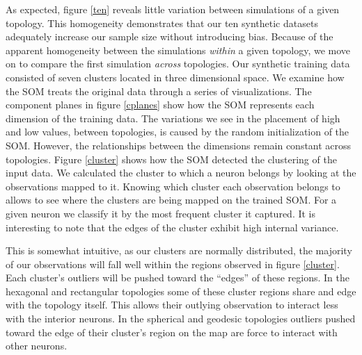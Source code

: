 As expected, figure \ref{ten} reveals little variation 
between simulations of a given topology.  This homogeneity demonstrates that
our ten synthetic datasets adequately increase our sample size without introducing bias.  
Because of the apparent homogeneity between the simulations \emph{within} a
given topology, we move on to compare the first simulation \emph{across} topologies.  
Our synthetic training data consisted of seven clusters located in three
dimensional space. We examine how the SOM treats the original data through a
series of visualizations.  The component planes in figure \ref{cplanes} show
how the SOM represents each dimension of the training data.  The variations we
see in the placement of high and low values, between topologies, is caused by
the random initialization of the SOM.  However, the relationships between the
dimensions remain constant across topologies.  Figure \ref{cluster} shows how
the SOM detected the clustering of the input data.  We calculated the cluster
to which a neuron belongs by looking at the observations mapped to it.
Knowing which cluster each observation belongs to allows to see where the
clusters are being mapped on the trained SOM. For a given neuron we classify
it by the most frequent cluster it captured.  It is interesting to note that
the edges of the cluster exhibit high internal variance.

This is somewhat intuitive, as our clusters are normally distributed, the
majority of our observations will fall well within the regions observed in
figure \ref{cluster}. Each cluster's outliers will be pushed toward the
``edges'' of these regions. In the hexagonal and rectangular topologies
some of these cluster regions share and edge with the topology itself.  This
allows their outlying observation to interact less with the interior neurons.
In the spherical and geodesic topologies outliers pushed toward the edge of
their cluster's region on the map are force to interact with other neurons.




